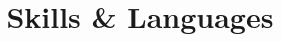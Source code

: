 \documentclass[12pt]{article} %
\begin{document}


%


%


\section*{\faGears\, Skills \& Languages}
\label{tools}











% 
\end{document}
